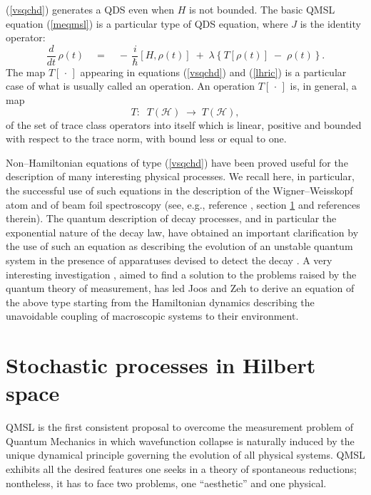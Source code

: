 \documentclass[12pt]{article}
\begin{document}
(\ref{vsqchd}) generates a QDS even when $H$ is not bounded. The
basic QMSL equation (\ref{meqmsl}) is a particular type of QDS
equation, where $J$ is the identity operator:
\begin{equation} \label{vsqchp}
\frac{d}{dt}\, \rho(t) \quad = \quad -\, \frac{i}{\hbar} [H
,\rho(t)] \; + \; \lambda \left\{ T[\rho(t)] \; - \; \rho(t)
\right\}.
\end{equation}
The map $T[\,\cdot\,]$ appearing in equations (\ref{vsqchd}) and
(\ref{lhric}) is a particular case of what is usually called an
operation. An operation $T[\,\cdot\,]$ is, in general, a map
\[
T: \;\; T({\mathcal H}) \; \longrightarrow \; T({\mathcal H}),
\]
of the set of trace class operators into itself which is linear,
positive and bounded with respect to the trace norm, with bound
less or equal to one.

Non--Hamiltonian equations of type (\ref{vsqchd}) have been proved
useful for the description of many interesting physical processes.
We recall here, in particular, the successful use of such
equations in the description of the Wigner--Weisskopf atom and of
 beam foil spectroscopy (see, e.g., reference \cite{dav},
section \ref{sec6} and references therein). The quantum
description of decay processes, and in particular the exponential
nature of the decay law, have obtained an important clarification
by the use of such an equation as describing the evolution of an
unstable quantum system in the presence of apparatuses devised to
detect the decay \cite{fons1}. A very interesting investigation
\cite{jz}, aimed to find a solution to the problems raised by the
quantum theory of measurement, has led Joos and Zeh to derive an
equation of the above type starting from the Hamiltonian dynamics
describing the unavoidable coupling of macroscopic systems to
their environment.


\section{Stochastic processes in Hilbert space} \label{sec6}

QMSL is the first consistent proposal to overcome the measurement
problem of Quantum Mechanics in which wavefunction collapse is
naturally induced by the unique dynamical principle governing the
evolution of all physical systems. QMSL exhibits all the desired
features one seeks in a theory of spontaneous reductions;
nontheless, it has to face two problems, one ``aesthetic'' and one
physical.
\end{document}
